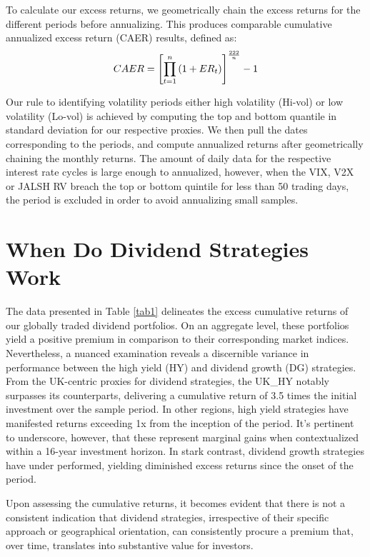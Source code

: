 \documentclass[11pt,preprint, authoryear]{elsarticle}
\numberwithin{equation}{section}
\numberwithin{figure}{section}
\numberwithin{table}{section}
\begin{document}
To calculate our excess returns, we geometrically chain the excess
returns for the different periods before annualizing. This produces
comparable cumulative annualized excess return (CAER) results, defined
as: \begin{align}
C A E R=\left[\prod_{t=1}^n\left(1+E R_t\right)\right]^{\frac{222}{n}}-1 \notag
\end{align}

Our rule to identifying volatility periods either high volatility
(Hi-vol) or low volatility (Lo-vol) is achieved by computing the top and
bottom quantile in standard deviation for our respective proxies. We
then pull the dates corresponding to the periods, and compute annualized
returns after geometrically chaining the monthly returns. The amount of
daily data for the respective interest rate cycles is large enough to
annualized, however, when the VIX, V2X or JALSH RV breach the top or
bottom quintile for less than 50 trading days, the period is excluded in
order to avoid annualizing small samples.

\hypertarget{when-do-dividend-strategies-work}{%
\section{When Do Dividend Strategies
Work}\label{when-do-dividend-strategies-work}}

The data presented in Table \ref{tab1} delineates the excess cumulative
returns of our globally traded dividend portfolios. On an aggregate
level, these portfolios yield a positive premium in comparison to their
corresponding market indices. Nevertheless, a nuanced examination
reveals a discernible variance in performance between the high yield
(HY) and dividend growth (DG) strategies. From the UK-centric proxies
for dividend strategies, the UK\_HY notably surpasses its counterparts,
delivering a cumulative return of 3.5 times the initial investment over
the sample period. In other regions, high yield strategies have
manifested returns exceeding 1x from the inception of the period. It's
pertinent to underscore, however, that these represent marginal gains
when contextualized within a 16-year investment horizon. In stark
contrast, dividend growth strategies have under performed, yielding
diminished excess returns since the onset of the period.

Upon assessing the cumulative returns, it becomes evident that there is
not a consistent indication that dividend strategies, irrespective of
their specific approach or geographical orientation, can consistently
procure a premium that, over time, translates into substantive value for
investors.
\end{document}
